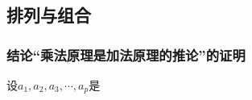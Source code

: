\documentclass{ctexart}
\begin{document}
    \subsection{排列与组合}
    \subsubsection{结论“乘法原理是加法原理的推论”的证明}
    设$a_1 , a_2 , a_3 , \cdots , a_p $是

    
\end{document}
